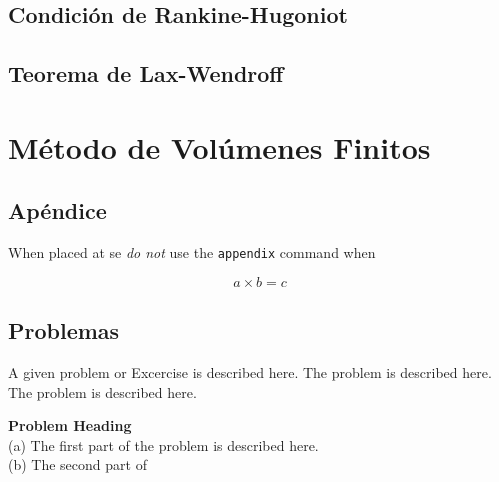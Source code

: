 \section{Condición de Rankine-Hugoniot}
\section{Teorema de Lax-Wendroff}

\chapter{Método de Volúmenes Finitos}

\section*{Apéndice}
%
When placed at se \textit{do not} use the \verb|appendix| command when

\begin{equation}
    a \times b = c
\end{equation}
\section*{Problemas}
%
\begin{prob}
    \label{prob1}
    A given problem or Excercise is described here. The
    problem is described here. The problem is described here.
\end{prob}

\begin{prob}
    \label{prob2}
    \textbf{Problem Heading}\\
    (a) The first part of the problem is described here.\\
    (b) The second part of
\end{prob}

